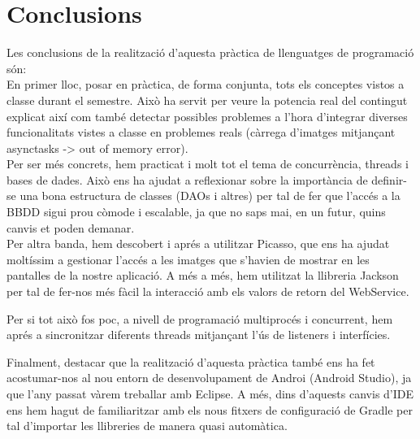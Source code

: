 \documentclass{article}[]
\begin{document}
\section{Conclusions}
Les conclusions de la realització d'aquesta pràctica de llenguatges de programació són:\\

En primer lloc, posar en pràctica, de forma conjunta, tots els conceptes vistos a classe durant el semestre. Això ha servit per veure la potencia real del contingut explicat així com també detectar possibles problemes a l'hora d'integrar diverses funcionalitats vistes a classe en problemes reals (càrrega d'imatges mitjançant asynctasks -> out of memory error).\\

Per ser més concrets, hem practicat i molt tot el tema de concurrència, threads i bases de dades. Això ens ha ajudat a reflexionar sobre la importància de definir-se una bona estructura de classes (DAOs i altres) per tal de fer que l'accés a la BBDD sigui prou còmode i escalable, ja que no saps mai, en un futur, quins canvis et poden demanar.\\

Per altra banda, hem descobert i aprés a utilitzar Picasso, que ens ha ajudat moltíssim a gestionar l'accés a les imatges que s'havien de mostrar en les pantalles de la nostre aplicació.  A més a més, hem utilitzat la llibreria Jackson per tal de fer-nos més fàcil la interacció amb els valors de retorn del WebService. 

Per si tot això fos poc, a nivell de programació multiprocés i concurrent, hem aprés a sincronitzar diferents threads mitjançant l'ús de listeners i interfícies.

Finalment, destacar que la realització d'aquesta pràctica també ens ha fet acostumar-nos al nou entorn de desenvolupament de Androi (Android Studio), ja que l'any passat vàrem treballar amb Eclipse. A més, dins d'aquests canvis d'IDE ens hem hagut de familiaritzar amb els nous fitxers de configuració de Gradle per tal d'importar les llibreries de manera quasi automàtica.
\end{document}
